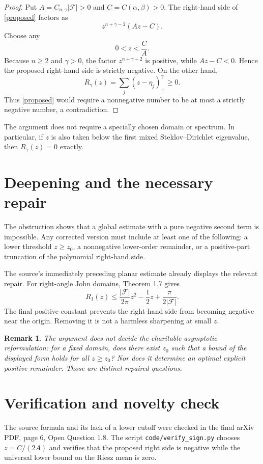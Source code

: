 \documentclass[11pt]{article}
\newtheorem{remark}{Remark}
\begin{document}
\begin{proof}
Put $A=C_{n,\gamma}|\mathcal F|>0$ and $C=C(\alpha,\beta)>0$. The right-hand
side of \eqref{proposed} factors as
\[
 z^{n+\gamma-2}(Az-C).
\]
Choose any
\[
 0<z<\frac{C}{A}.
\]
Because $n\geq2$ and $\gamma>0$, the factor $z^{n+\gamma-2}$ is positive,
while $Az-C<0$. Hence the proposed right-hand side is strictly negative.
On the other hand,
\[
 R_\gamma(z)=\sum_j(z-\eta_j)_+^\gamma\geq0.
\]
Thus \eqref{proposed} would require a nonnegative number to be at most a
strictly negative number, a contradiction.
\end{proof}

The argument does not require a specially chosen domain or spectrum. In
particular, if $z$ is also taken below the first mixed
Steklov--Dirichlet eigenvalue, then $R_\gamma(z)=0$ exactly.

\section{Deepening and the necessary repair}
The obstruction shows that a global estimate with a pure negative second
term is impossible. Any corrected version must include at least one of the
following: a lower threshold $z\geq z_0$, a nonnegative lower-order remainder,
or a positive-part truncation of the polynomial right-hand side.

The source's immediately preceding planar estimate already displays the
relevant repair. For right-angle John domains, Theorem 1.7 gives
\[
 R_1(z)\leq \frac{|\mathcal F|}{2\pi}z^2-\frac12z
 +\frac{\pi}{2|\mathcal F|}.
\]
The final positive constant prevents the right-hand side from becoming
negative near the origin. Removing it is not a harmless sharpening at small
$z$.

\begin{remark}
The argument does not decide the charitable asymptotic reformulation: for a
fixed domain, does there exist $z_0$ such that a bound of the displayed form
holds for all $z\geq z_0$? Nor does it determine an optimal explicit positive
remainder. Those are distinct repaired questions.
\end{remark}

\section{Verification and novelty check}
The source formula and its lack of a lower cutoff were checked in the final
arXiv PDF, page 6, Open Question 1.8. The script
\texttt{code/verify\_sign.py} chooses $z=C/(2A)$ and verifies that the proposed
right side is negative while the universal lower bound on the Riesz mean is
zero.
\end{document}
